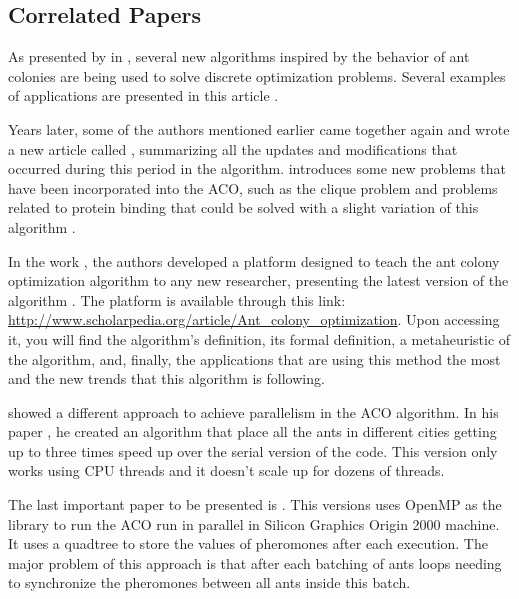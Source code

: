 \subsection{Correlated Papers}

As presented by \citeauthor{ACO_New_Algorithm} in , several
new algorithms inspired by the behavior of ant colonies are being used
to solve discrete optimization problems. Several
examples of applications are presented in this article \cite{ACO_New_Algorithm}.

Years later, some of the authors mentioned earlier came together again and
wrote a new article called , summarizing all the updates
and modifications that occurred during this period in the algorithm. \citeauthor{UpdatesInACO} introduces
some new problems that have been incorporated into the ACO, such as the clique problem and problems
related to protein binding that could be solved with a slight variation of this algorithm
\cite{UpdatesInACO}.

In the work , the authors \citeauthor{ACO_New_Algorithm_20anos}
developed a platform designed to teach the ant colony optimization algorithm
to any new researcher, presenting the latest version of the algorithm \cite{ACO_New_Algorithm_20anos}.
The platform is available through this link: \url{http://www.scholarpedia.org/article/Ant_colony_optimization}.
Upon accessing it, you will find the algorithm's definition, its formal definition, a metaheuristic
of the algorithm, and, finally, the applications that are using this method the most and the new trends
that this algorithm is following.

 showed a different approach to achieve parallelism in the ACO algorithm.
In his paper , he created an algorithm that place all the ants in different
cities getting up to three times speed up over the serial version of the code. This version only works
using CPU threads and it doesn't scale up for dozens of threads.

The last important paper to be presented is . This versions uses OpenMP as the library
to run the ACO run in parallel in Silicon Graphics Origin 2000 machine.
It uses a quadtree to store the values of pheromones after each execution. The major problem of
this approach is that after each batching of ants loops needing to synchronize the pheromones between all
ants inside this batch.
